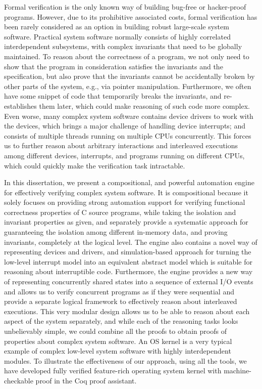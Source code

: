 Formal verification is the only known way of building bug-free or hacker-proof
programs. However, due to its prohibitive associated costs, formal verification
has been rarely considered as an option in building robust large-scale system software.
Practical system software normally consists of highly correlated interdependent subsystems,
with complex invariants that need to be globally maintained. To reason about the correctness of
a program, we not only need to show that the program in consideration
satisfies the invariants and the specification, but also prove that the invariants cannot be
accidentally broken by other parts of the system, e.g., via pointer manipulation.
Furthermore, we often have some snippet of code that temporarily breaks the invariants,
and re-establishes them later, which could make reasoning of such code more complex.
Even worse, many complex system software contains device drivers to work with the devices,
which brings a major challenge of handling device interrupts;
and consists of multiple threads running on multiple CPUs concurrently. 
This forces us to further reason about arbitrary interactions and interleaved executions among
different devices, interrupts, and programs running on different CPUs, which could quickly make the verification
task intractable.

In this dissertation, we present a compositional, and powerful automation engine for effectively
verifying complex system software. It is compositional because it solely focuses on providing strong automation
support for verifying functional correctness properties of C source programs, while taking the
isolation and invariant properties as given, and separately provide a systematic approach
for guaranteeing the isolation among different in-memory data, and proving invariants, completely
at the logical level. The engine also contains a novel way of representing devices and drivers, and
simulation-based approach for turning the low-level interrupt model into an equivalent abstract model which is
suitable for reasoning about interruptible code. Furthermore, the engine provides a new way of representing
concurrently shared states into a sequence of external I/O events and allows us to verify 
concurrent programs as if they were sequential and provide a separate logical framework to effectively
reason about interleaved executions. This very modular design allows us to be able to reason about each
aspect of the system separately, and while each of the reasoning tasks looks unbelievably simple, we could combine
all the proofs to obtain proofs of properties about complex system software.
An OS kernel is a very typical example of complex low-level system software with highly interdependent modules.
To illustrate the effectiveness of our approach, using all the tools, we have developed fully verified feature-rich
operating system kernel with machine-checkable proof in the Coq proof assistant.



